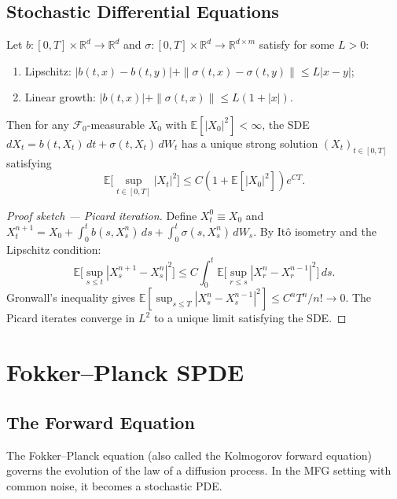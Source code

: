 \subsection{Stochastic Differential Equations}

\begin{theorem}
\label{thm:sde-existence-uniqueness}
Let $b : [0,T] \times \mathbb{R}^d \to \mathbb{R}^d$ and
$\sigma : [0,T] \times \mathbb{R}^d \to \mathbb{R}^{d \times m}$ satisfy for some
$L > 0$:
\begin{enumerate}[label=(\roman*)]
    \item Lipschitz: $|b(t,x) - b(t,y)| + \|\sigma(t,x) - \sigma(t,y)\| \leq L|x-y|$;
    \item Linear growth: $|b(t,x)| + \|\sigma(t,x)\| \leq L(1+|x|)$.
\end{enumerate}
Then for any $\mathcal{F}_0$-measurable $X_0$ with $\mathbb{E}[|X_0|^2] < \infty$, the
SDE $dX_t = b(t,X_t)\, dt + \sigma(t,X_t)\, dW_t$ has a unique strong solution
$(X_t)_{t \in [0,T]}$ satisfying
\[
    \mathbb{E}\Big[ \sup_{t \in [0,T]} |X_t|^2 \Big] \leq C(1+\mathbb{E}[|X_0|^2])
    e^{CT}.
\]
\end{theorem}

\begin{proof}[Proof sketch --- Picard iteration]
Define $X_t^0 \equiv X_0$ and
$X_t^{n+1} = X_0 + \int_0^t b(s,X_s^n)\, ds + \int_0^t \sigma(s,X_s^n)\, dW_s$. By
It\^o isometry and the Lipschitz condition:
\[
    \mathbb{E}\Big[ \sup_{s \leq t} |X_s^{n+1} - X_s^n|^2 \Big] \leq C \int_0^t
    \mathbb{E}\Big[ \sup_{r \leq s} |X_r^n - X_r^{n-1}|^2 \Big]\, ds.
\]
Gronwall's inequality gives
$\mathbb{E}[\sup_{s \leq T} |X_s^n - X_s^{n-1}|^2] \leq C^n T^n / n! \to 0$. The Picard
iterates converge in $L^2$ to a unique limit satisfying the SDE.
\end{proof}


\section{Fokker--Planck SPDE}
\label{sec:mp-fokker-planck}

\subsection{The Forward Equation}

The Fokker--Planck equation (also called the Kolmogorov forward equation) governs the
evolution of the law of a diffusion process. In the MFG setting with common noise, it
becomes a stochastic PDE.

